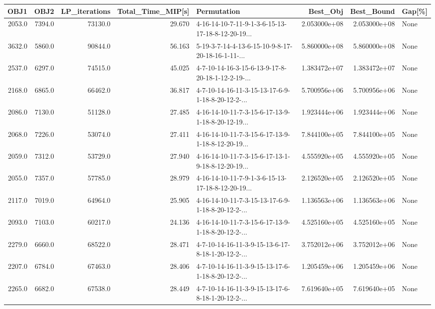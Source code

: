\begin{tabular}{rrrrlrrl}
\toprule
   OBJ1 &    OBJ2 &  LP\_iterations &  Total\_Time\_MIP[s] &                                        Permutation &      Best\_Obj &    Best\_Bound & Gap[\%] \\
\midrule
 2053.0 &  7394.0 &        73130.0 &             29.670 &  4-16-14-10-7-11-9-1-3-6-15-13-17-18-8-12-20-19... &  2.053000e+08 &  2.053000e+08 &   None \\
 3632.0 &  5860.0 &        90844.0 &             56.163 &  5-19-3-7-14-4-13-6-15-10-9-8-17-20-18-16-1-11-... &  5.860000e+08 &  5.860000e+08 &   None \\
 2537.0 &  6297.0 &        74515.0 &             45.025 &  4-7-10-14-16-3-15-6-13-9-17-8-20-18-1-12-2-19-... &  1.383472e+07 &  1.383472e+07 &   None \\
 2168.0 &  6865.0 &        66462.0 &             36.817 &  4-7-10-14-16-11-3-15-13-17-6-9-1-18-8-20-12-2-... &  5.700956e+06 &  5.700956e+06 &   None \\
 2086.0 &  7130.0 &        51128.0 &             27.485 &  4-16-14-10-11-7-3-15-6-17-13-9-1-18-8-20-12-19... &  1.923444e+06 &  1.923444e+06 &   None \\
 2068.0 &  7226.0 &        53074.0 &             27.411 &  4-16-14-10-11-7-3-15-6-17-13-9-1-18-8-12-20-19... &  7.844100e+05 &  7.844100e+05 &   None \\
 2059.0 &  7312.0 &        53729.0 &             27.940 &  4-16-14-10-11-7-3-15-6-17-13-1-9-18-8-12-20-19... &  4.555920e+05 &  4.555920e+05 &   None \\
 2055.0 &  7357.0 &        57785.0 &             28.979 &  4-16-14-10-11-7-9-1-3-6-15-13-17-18-8-12-20-19... &  2.126520e+05 &  2.126520e+05 &   None \\
 2117.0 &  7019.0 &        64964.0 &             25.905 &  4-16-14-10-11-7-3-15-13-17-6-9-1-18-8-20-12-2-... &  1.136563e+06 &  1.136563e+06 &   None \\
 2093.0 &  7103.0 &        60217.0 &             24.136 &  4-16-14-10-11-7-3-15-6-17-13-9-1-18-8-20-12-2-... &  4.525160e+05 &  4.525160e+05 &   None \\
 2279.0 &  6660.0 &        68522.0 &             28.471 &  4-7-10-14-16-11-3-9-15-13-6-17-8-18-1-20-12-2-... &  3.752012e+06 &  3.752012e+06 &   None \\
 2207.0 &  6784.0 &        67463.0 &             28.406 &  4-7-10-14-16-11-3-9-15-13-17-6-1-18-8-20-12-2-... &  1.205459e+06 &  1.205459e+06 &   None \\
 2265.0 &  6682.0 &        67538.0 &             28.449 &  4-7-10-14-16-11-3-9-15-13-17-6-8-18-1-20-12-2-... &  7.619640e+05 &  7.619640e+05 &   None \\

\end{tabular}
